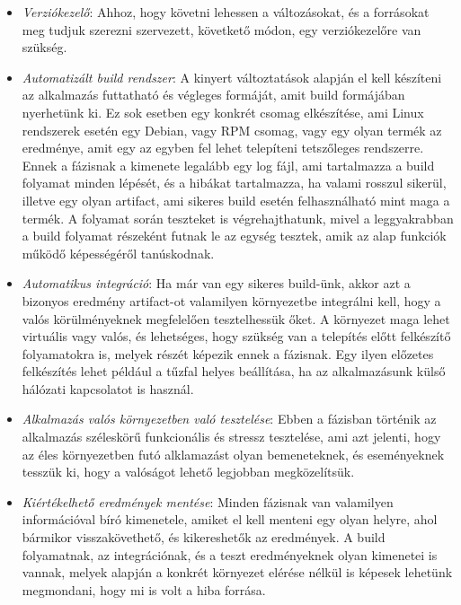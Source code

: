 \documentclass[11pt,magyar,a4paper,twoside,]{report}
\providecommand{\tightlist}{%
  \setlength{\itemsep}{0pt}\setlength{\parskip}{0pt}}
\begin{document}
\begin{itemize}
\tightlist
\item
  \emph{Verziókezelő}: Ahhoz, hogy követni lehessen a változásokat, és a
  forrásokat meg tudjuk szerezni szervezett, követkető módon, egy
  verziókezelőre van szükség.
\item
  \emph{Automatizált build rendszer}: A kinyert változtatások alapján el
  kell készíteni az alkalmazás futtatható és végleges formáját, amit
  build formájában nyerhetünk ki. Ez sok esetben egy konkrét csomag
  elkészítése, ami Linux rendszerek esetén egy Debian, vagy RPM csomag,
  vagy egy olyan termék az eredménye, amit egy az egyben fel lehet
  telepíteni tetszőleges rendszerre. Ennek a fázisnak a kimenete
  legalább egy log fájl, ami tartalmazza a build folyamat minden
  lépését, és a hibákat tartalmazza, ha valami rosszul sikerül, illetve
  egy olyan artifact, ami sikeres build esetén felhasználható mint maga
  a termék. A folyamat során teszteket is végrehajthatunk, mivel a
  leggyakrabban a build folyamat részeként futnak le az egység tesztek,
  amik az alap funkciók működő képességéről tanúskodnak.
\item
  \emph{Automatikus integráció}: Ha már van egy sikeres build-ünk, akkor
  azt a bizonyos eredmény artifact-ot valamilyen környezetbe integrálni
  kell, hogy a valós körülményeknek megfelelően tesztelhessük őket. A
  környezet maga lehet virtuális vagy valós, és lehetséges, hogy szükség
  van a telepítés előtt felkészítő folyamatokra is, melyek részét
  képezik ennek a fázisnak. Egy ilyen előzetes felkészítés lehet például
  a tűzfal helyes beállítása, ha az alkalmazásunk külső hálózati
  kapcsolatot is használ.
\item
  \emph{Alkalmazás valós környezetben való tesztelése}: Ebben a fázisban
  történik az alkalmazás széleskörű funkcionális és stressz tesztelése,
  ami azt jelenti, hogy az éles környezetben futó alklamazást olyan
  bemeneteknek, és eseményeknek tesszük ki, hogy a valóságot lehető
  legjobban megközelítsük.
\item
  \emph{Kiértékelhető eredmények mentése}: Minden fázisnak van
  valamilyen információval bíró kimenetele, amiket el kell menteni egy
  olyan helyre, ahol bármikor visszakövethető, és kikereshetők az
  eredmények. A build folyamatnak, az integrációnak, és a teszt
  eredményeknek olyan kimenetei is vannak, melyek alapján a konkrét
  környezet elérése nélkül is képesek lehetünk megmondani, hogy mi is
  volt a hiba forrása.
\end{itemize}
\end{document}
